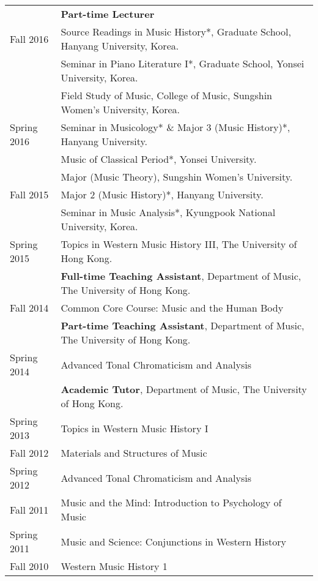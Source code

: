 \documentclass[a4paper,11pt,draft]{article}
\begin{document}
  \hspace*{-0.25cm}
  \begin{tabular}{p{2.5cm} l}
    & \textbf{Part-time Lecturer}\\
    Fall 2016 & Source Readings in Music History*, Graduate School, Hanyang University, Korea.\\
    & Seminar in Piano Literature I*, Graduate School, Yonsei University, Korea.\\
    & Field Study of Music, College of Music, Sungshin Women's University, Korea.\\
    
    Spring 2016 & Seminar in Musicology* \& Major 3 (Music History)*, Hanyang University.\\
    & Music of Classical Period*, Yonsei University.\\
    & Major (Music Theory), Sungshin Women's University.\\
    
    Fall 2015 & Major 2 (Music History)*, Hanyang University.\\
    & Seminar in Music Analysis*, Kyungpook National University, Korea.\\
    
    Spring 2015 & Topics in Western Music History III, The University of Hong Kong.\\[2mm]
    
    & \textbf{Full-time Teaching Assistant}, Department of Music, The University of Hong Kong.\\
    Fall 2014 & Common Core Course: Music and the Human Body\\[2mm]
    
    & \textbf{Part-time Teaching Assistant}, Department of Music, The University of Hong Kong.\\
    Spring 2014 & Advanced Tonal Chromaticism and Analysis\\[2mm]
    
    & \textbf{Academic Tutor}, Department of Music, The University of Hong Kong.\\
    Spring 2013 & Topics in Western Music History I\\
    Fall 2012 & Materials and Structures of Music\\
    Spring 2012 & Advanced Tonal Chromaticism and Analysis\\
    Fall 2011 & Music and the Mind: Introduction to Psychology of Music\\
    Spring 2011 & Music and Science: Conjunctions in Western History\\
    Fall 2010 & Western Music History 1\\[2mm]
    

\end{tabular}
\end{document}
